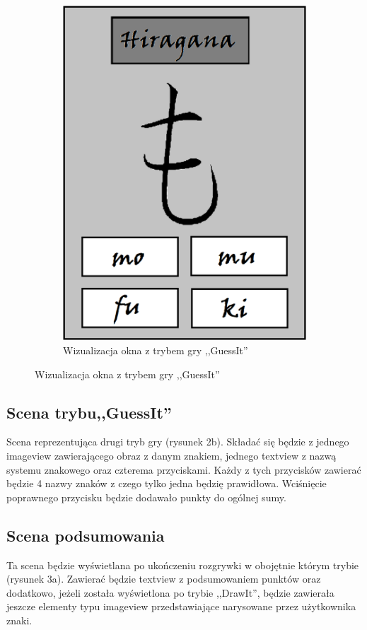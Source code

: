 \documentclass[15pt]{article}
\begin{document}
\begin{figure}[h!]
\begin{subfigure}[b]{0.35\linewidth}
      \includegraphics[width=\linewidth]{guess.png}
      \caption{Wizualizacja okna z trybem gry ,,GuessIt''}
    \end{subfigure}
    \label{fig:coffee}
  \end{figure}

  
  \subsection{Scena trybu,,GuessIt''}
  
  Scena reprezentująca drugi tryb gry (rysunek 2b). Składać się będzie z jednego imageview zawierającego obraz z danym znakiem, jednego textview z nazwą systemu znakowego oraz czterema przyciskami. Każdy z tych przycisków zawierać będzie 4 nazwy znaków z czego tylko jedna będzię prawidłowa. Wciśnięcie poprawnego przycisku będzie dodawało punkty do ogólnej sumy.
  
  \subsection{Scena podsumowania}
  Ta scena będzie wyświetlana po ukończeniu rozgrywki w obojętnie którym trybie (rysunek 3a). Zawierać będzie textview z podsumowaniem punktów oraz dodatkowo, jeżeli została wyświetlona po trybie ,,DrawIt'', będzie zawierała jeszcze elementy typu imageview przedstawiające narysowane przez użytkownika znaki.
  
\end{document}
